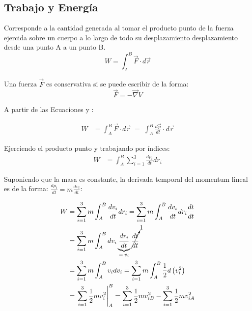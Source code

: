 \documentclass[/home/hernan/Documentos/Apuntes_mecanica_teorica/main.tex]{subfiles}
\begin{document}
	\subsection{Trabajo y Energía}

	\begin{definition} Corresponde a la cantidad generada al tomar el producto punto de la fuerza ejercida sobre un cuerpo a lo largo de todo su desplazamiento desplazamiento desde una punto A a un punto B.
		\begin{equation}
			W = \int_{A}^{B} \vec{F} \cdot d\vec{r}
			\label{eq: work}
		\end{equation}
	\end{definition}

	\begin{definition} Una fuerza $\vec{F}$ es conservativa si se puede escribir de la forma:
		\begin{equation}
			\vec{F} = - \vec{\nabla}V
			\label{eq: conservativeforce}
		\end{equation}
	\end{definition}

	A partir de las Ecuaciones  y :

	\begin{align*}
		W & = \int_{A}^{B} \vec{F} \cdot d\vec{r} \; = \; \int_{A}^{B}  \frac{d \vec{p}}{dt} \cdot d\vec{r}
	\end{align*}

	Ejerciendo el producto punto y trabajando por índices:
	\begin{align*}
		W & = \int_{A}^{B} \sum_{i=1}^{3} \frac{d p_{i}}{dt}dr_{i}
	\end{align*}

	Suponiendo que la masa es constante, la derivada temporal del momentum lineal es de la forma: $\frac{d p_{i}}{dt} = m \frac{d v_{i}}{dt}$:

	\begin{align*}
		W & =  \sum_{i=1}^{3} m \int_{A}^{B} \frac{d v_{i}}{dt}dr_{i} =  \sum_{i=1}^{3} m \int_{A}^{B} \frac{d v_{i}}{dt}dr_{i} \frac{dt}{dt}\\ 
		& = \sum_{i=1}^{3} m \int_{A}^{B} d v_{i} \underbrace{\frac{d r_{i}}{dt}}_{= \: v_{i}} \cancelto{1}{\frac{dt}{dt}}\\
		& = \sum_{i=1}^{3} m \int_{A}^{B}  v_{i} d v_{i} =  \sum_{i=1}^{3} m \int_{A}^{B} \frac{1}{2} d \left(v_{i}^{2}\right)\\
		& = \left . \sum_{i=1}^{3} \frac{1}{2} m v_{i}^{2} \right|_{A} ^{B} = \sum_{i=1}^{3} \frac{1}{2} m v_{iB}^{2} - \sum_{i=1}^{3} \frac{1}{2} m v_{iA}^{2}
	\end{align*}
\end{document}
